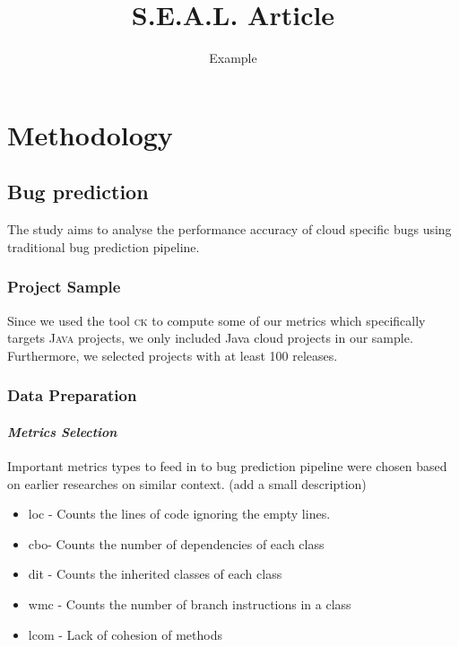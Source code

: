 \documentclass{seal_article}
\title{S.E.A.L. Article}
\subtitle{Example}
\begin{document}
\maketitle

\section{Methodology}

\subsection{Bug prediction}
The study aims to analyse the performance accuracy of cloud specific bugs using traditional bug prediction pipeline. 

\subsubsection{Project Sample}
Since we used the tool \textsc{ck} \cite{ck} to compute some of our metrics which specifically targets \textsc{Java} projects, we only included Java cloud projects in our sample. Furthermore, we selected projects with at least 100 releases.
\subsubsection{Data Preparation}
\paragraph{\textit{Metrics Selection}}
Important metrics types to feed in to bug prediction pipeline were chosen based on earlier researches on similar context.  (add a small description)

\begin{itemize}
\item loc - Counts the lines of code ignoring the empty lines.
\item cbo- Counts the number of dependencies of each class 
\item dit -  Counts the inherited classes of each class
\item wmc - Counts the number of branch instructions in a class
\item lcom - Lack of cohesion of methods
\end{itemize}
\end{document}

